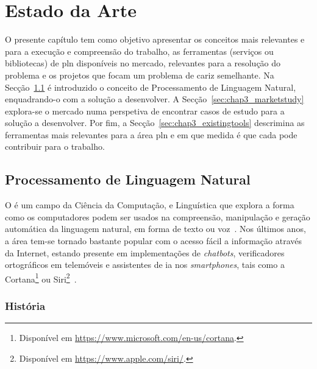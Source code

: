 \chapter{Estado da Arte}
\label{chap:Chapter3}

O presente capítulo tem como objetivo apresentar os conceitos mais relevantes e para a execução e compreensão do trabalho, as ferramentas (serviços ou bibliotecas) de \gls{pln} disponíveis no mercado, relevantes para a resolução do problema e os projetos que focam um problema de cariz semelhante. Na Secção~\ref{sec:chap3_pln} é introduzido o conceito de Processamento de Linguagem Natural, enquadrando-o com a solução a desenvolver. A Secção~\ref{sec:chap3_marketstudy} explora-se o mercado numa perspetiva de encontrar casos de estudo para a solução a desenvolver. Por fim, a Secção~\ref{sec:chap3_existingtools} descrimina as ferramentas mais relevantes para a área \gls{pln} e em que medida é que cada pode contribuir para o trabalho. 

\section{Processamento de Linguagem Natural}
\label{sec:chap3_pln}

O  é um campo da Ciência da Computação,  e Linguística que explora a forma como os computadores podem ser usados na compreensão, manipulação e geração automática da linguagem natural, em forma de texto ou voz~\parencite{nlp, applied_natural_language_processing_with_python, pln_extracao_conhecimento}. Nos últimos anos, a área tem-se tornado bastante popular com o acesso fácil a informação através da Internet, estando presente em implementações de \textit{chatbots}, verificadores ortográficos em telemóveis e assistentes de \gls{ia} nos \textit{smartphones}, tais como a Cortana\footnote{Disponível em \url{https://www.microsoft.com/en-us/cortana}.} ou Siri\footnote{Disponível em \url{https://www.apple.com/siri/}.}~\parencite{pln_extracao_conhecimento, applied_natural_language_processing_with_python}. 

\subsection{História}

